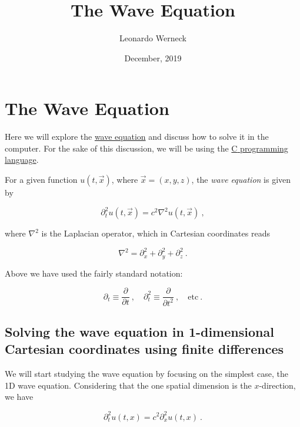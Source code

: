 \documentclass[a4paper,11pt]{article}
\title{The Wave Equation}
\author{Leonardo Werneck}
\date{December, 2019}
\def\cpp{{C\nolinebreak[4]\hspace{-.05em}\raisebox{.4ex}{\tiny\bf ++}}}
\begin{document}
\maketitle
\tableofcontents
\listoffigures

\section{The Wave Equation}

Here we will explore the \href{https://en.wikipedia.org/wiki/Wave_equation}{wave equation} and discuss how to solve it in the computer. For the sake of this discussion, we will be using the \href{https://en.wikipedia.org/wiki/C\%2B\%2B}{{\cpp} programming language}.

For a given function $u(t,\vec{x})$, where $\vec{x}=(x,y,z)$, the \emph{wave equation} is given by

\begin{equation}
\partial_{t}^{2}u(t,\vec{x}) = c^{2}\nabla^{2}u(t,\vec{x})\ ,
\end{equation}

\noindent where $\nabla^{2}$ is the Laplacian operator, which in Cartesian coordinates reads

\begin{equation}
\nabla^{2} = \partial_{x}^{2} + \partial_{y}^{2} + \partial_{z}^{2}\ .
\end{equation}

\noindent Above we have used the fairly standard notation:

\begin{equation}
\partial_{t} \equiv \frac{\partial}{\partial t}\ ,\quad \partial_{t}^{2} \equiv \frac{\partial}{\partial t^{2}}\ , \quad \text{etc}\ .
\end{equation}

\subsection{Solving the wave equation in 1-dimensional Cartesian coordinates using finite differences}

We will start studying the wave equation by focusing on the simplest case, the 1D wave equation. Considering that the one spatial dimension is the $x$-direction, we have

\begin{equation}
\partial_{t}^{2}u(t,x) = c^{2}\partial_{x}^{2}u(t,x)\ .
\end{equation}
\end{document}
